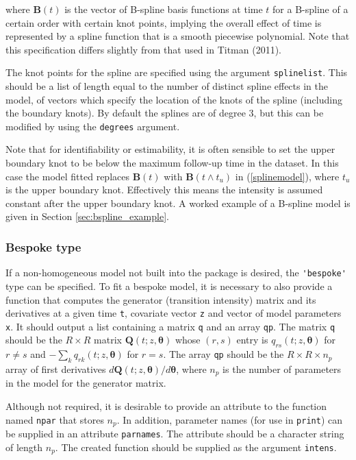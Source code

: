 \documentclass{article}
\numberwithin{equation}{section}
\begin{document}
where $\mathbf{B}(t)$ is the vector of B-spline basis functions at time $t$ for a B-spline of a certain order with certain knot points, implying the overall effect of time is represented by a spline function that is a smooth piecewise polynomial. Note that this specification differs slightly from that used in Titman (2011).

The knot points for the spline are specified using the argument \verb!splinelist!. This should be a list of length equal to the number of distinct spline effects in the model, of vectors which specify the location of the knots of the spline (including the boundary knots). By default the splines are of degree 3, but this can be modified by using the \verb!degrees! argument.

Note that for identifiability or estimability, it is often sensible to set the upper boundary knot to be below the maximum follow-up time in the dataset. In this case the model fitted replaces $\mathbf{B}(t)$  with $\mathbf{B}(t \wedge t_u)$ in
(\ref{splinemodel}), where $t_u$ is the upper boundary knot. Effectively this means the intensity is assumed constant after the upper boundary knot. A worked example of a B-spline model is given in Section \ref{sec:bspline_example}.

\subsubsection*{Bespoke type}

If a non-homogeneous model not built into the package is desired, the \verb!'bespoke'! type can be specified. To fit a bespoke model, it is necessary to also provide a function that computes the generator (transition intensity) matrix and its derivatives at a given time \verb!t!, covariate vector \verb!z! and vector of model parameters \verb!x!. It should output a list containing a matrix \verb!q! and an array \verb!qp!. The matrix \verb!q! should be the $R \times R$ matrix $\mathbf{Q}(t; z, \bm\theta)$ whose $(r,s)$ entry is $q_{rs}(t; z, \bm\theta)$ for $r \neq s$ and $-\sum_{k} q_{rk}(t;z,\bm\theta)$ for $r = s$. The array \verb!qp! should be the $R \times R \times n_p$ array of first derivatives
${d\mathbf{Q}(t ; z, \bm\theta)}/{d\bm\theta}$, where $n_p$ is the number of parameters in the model for the generator matrix.

Although not required, it is desirable to provide an attribute to the function named \verb!npar! that stores $n_p$. In addition, parameter names (for use in \verb!print!) can be supplied in an attribute \verb!parnames!. The attribute should be a character string of length $n_p$. The created function should be supplied as the argument \verb!intens!.
\end{document}
